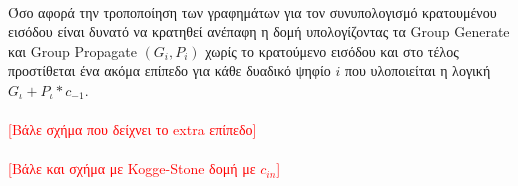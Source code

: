 \\
Όσο αφορά την τροποποίηση των γραφημάτων για τον συνυπολογισμό κρατουμένου εισόδου
είναι δυνατό να κρατηθεί ανέπαφη η δομή υπολογίζοντας τα Group Generate και Group Propagate 
$(G_i,P_i)$ χωρίς το κρατούμενο εισόδου  και στο τέλος προστίθεται ένα ακόμα επίπεδο
για κάθε δυαδικό ψηφίο $i$ που υλοποιείται η λογική $G_ι + P_ι*c_{-1}$.
\\\\
\textcolor{red}{[Βάλε σχήμα που δείχνει το extra επίπεδο]}
\\\\
\textcolor{red}{[Βάλε και σχήμα με Kogge-Stone δομή με $c_{in}$]}
\\\\


